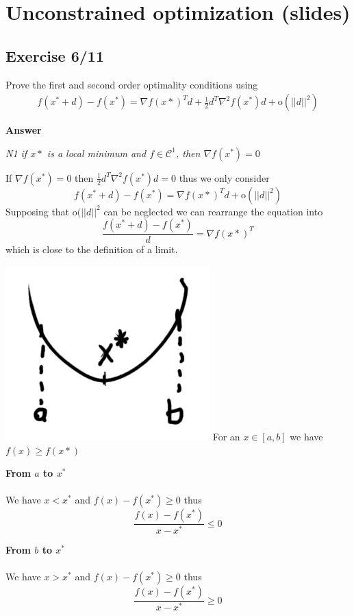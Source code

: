 \section{Unconstrained optimization (slides)}
\subsection{Exercise 6/11}
Prove the first and second order optimality conditions using
\begin{align*}
f(x^* + d) - f(x^*) = \nabla f(x*)^T d + \frac{1}{2} d^T \nabla^2 f(x^*)d + \text{o}(||d||^2)
\end{align*}

\textbf{Answer}

\hspace{0.5in} \textit{N1 if $x*$ is a local minimum and $f\in \mathcal{C}^1$, then $\nabla f(x^*) = 0$}

If $\nabla f(x^*) = 0$ then $\frac{1}{2} d^T \nabla^2 f(x^*)d = 0$ thus we only consider
\[
f(x^* + d) - f(x^*) = \nabla f(x*)^T d + \text{o}(||d||^2)
\]
Supposing that $\text{o}(||d||^2$ can be neglected we can rearrange the equation into
\[
\frac{f(x^* + d) - f(x^*)}{d} = \nabla f(x*)^T
\]
which is close to the definition of a limit.

\includegraphics[scale=0.5]{fig/unconstrained/6_11.png} For an $x \in [a, b]$ we have $f(x) \geq f(x*)$

\begin{minipage}[t]{.5\textwidth}
  \textbf{From $a$ to $x^*$}\\
  \\
  We have $x < x^*$ and $f(x) - f(x^*) \geq 0$ thus
  \[
  	\frac{f(x) - f(x^*)}{x - x^*} \leq 0
  \]
\end{minipage}
\hspace{0.025\textwidth}\vline\hspace{0.025\textwidth}
\begin{minipage}[t]{.5\textwidth}
  \textbf{From $b$ to $x^*$}\\
  \\
  We have $x > x^*$ and $f(x) - f(x^*) \geq 0$ thus
  \[
  	\frac{f(x) - f(x^*)}{x - x^*} \geq 0
  \]
\end{minipage}

